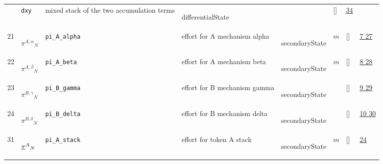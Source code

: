 \begin{longtable}{|p{1cm}|p{3cm}|p{3cm}|p{7cm}|p{3.0cm}|p{3cm}|p{2cm}|p{1cm}|}
             & \verb|dxy|
             & mixed stack of the two accumulation terms
             & \begin{lay}differentialState \end{lay}
             & $  $
             & []
             & \hyperlink{"e:34"}{ 34 }
                 \\
    21
             & \hypertarget{"v:21"}{ $ {{\pi^{A,\alpha}}}{_{N}} $}
             & \verb|pi_A_alpha|
             & effort for A mechanism alpha
             & \begin{lay}secondaryState \end{lay}
             & $ m  $
             & []
             & \hyperlink{"e:7"}{ 7 }
                 \hyperlink{"e:27"}{ 27 }
                 \\
    22
             & \hypertarget{"v:22"}{ $ {{\pi^{A,\beta}}}{_{N}} $}
             & \verb|pi_A_beta|
             & effort for A mechanism beta
             & \begin{lay}secondaryState \end{lay}
             & $ m  $
             & []
             & \hyperlink{"e:8"}{ 8 }
                 \hyperlink{"e:28"}{ 28 }
                 \\
    23
             & \hypertarget{"v:23"}{ $ {{\pi^{B,\gamma}}}{_{N}} $}
             & \verb|pi_B_gamma|
             & effort for B mechanism gamma
             & \begin{lay}secondaryState \end{lay}
             & $  $
             & []
             & \hyperlink{"e:9"}{ 9 }
                 \hyperlink{"e:29"}{ 29 }
                 \\
    24
             & \hypertarget{"v:24"}{ $ {{\pi^{B,\delta}}}{_{N}} $}
             & \verb|pi_B_delta|
             & effort for B mechanism delta
             & \begin{lay}secondaryState \end{lay}
             & $  $
             & []
             & \hyperlink{"e:10"}{ 10 }
                 \hyperlink{"e:30"}{ 30 }
                 \\
    31
             & \hypertarget{"v:31"}{ $ {{{{\protect\underline{\bf{\pi}}}}^A}}{_{N}} $}
             & \verb|pi_A_stack|
             & effort for token A stack
             & \begin{lay}secondaryState \end{lay}
             & $ m  $
             & []
             & \hyperlink{"e:24"}{ 24 }
                 \\

\end{longtable}
